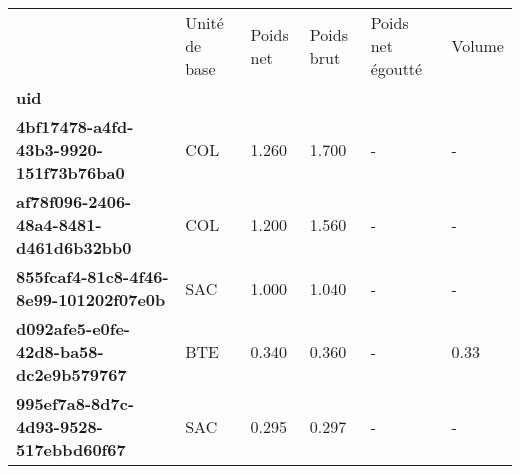 \begin{tabularx}{\linewidth}{lXXXXX}
\toprule
{} & Unité de base &  Poids net &  Poids brut &  Poids net égoutté &  Volume \\
\textbf{uid                                 } &               &            &             &                    &         \\
\midrule
\textbf{4bf17478-a4fd-43b3-9920-151f73b76ba0} &           COL &      1.260 &       1.700 &                  - &       - \\
\textbf{af78f096-2406-48a4-8481-d461d6b32bb0} &           COL &      1.200 &       1.560 &                  - &       - \\
\textbf{855fcaf4-81c8-4f46-8e99-101202f07e0b} &           SAC &      1.000 &       1.040 &                  - &       - \\
\textbf{d092afe5-e0fe-42d8-ba58-dc2e9b579767} &           BTE &      0.340 &       0.360 &                  - &    0.33 \\
\textbf{995ef7a8-8d7c-4d93-9528-517ebbd60f67} &           SAC &      0.295 &       0.297 &                  - &       - \\
\bottomrule
\end{tabularx}
